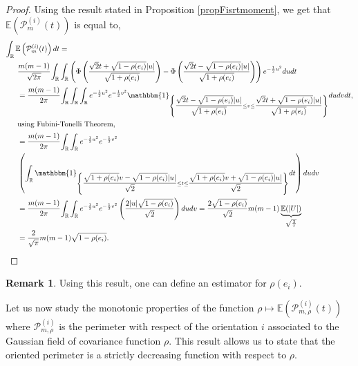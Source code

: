 \documentclass[12pt]{article}
\theoremstyle{Theorem}
\theoremstyle{definition}
\newtheorem{remark}{Remark}
\begin{document}
\begin{proof}
Using the result stated in Proposition \ref{propFisrtmoment}, we get that $\mathbb{E}\left(\mathcal{P}^{\scriptscriptstyle  (i)}_{m}(t) \right)$ is equal to,
{\small
\begin{align*}
\int_{\mathbb{R}} \mathbb{E}\left(\mathcal{P}^{(i)}_{m}(t)\right) dt & = \\
& \hspace{-2cm}\cfrac{m(m-1)}{\sqrt{2\pi}} \int_{\mathbb{R}}\int_{\mathbb{R}} \left(\Phi\left(\dfrac{\sqrt{2}t + \sqrt{1-\rho(e_i)}|u|}{\sqrt{1+\rho(e_i)}}\right) - \Phi\left(\dfrac{\sqrt{2}t - \sqrt{1-\rho(e_i)}|u|}{\sqrt{1+\rho(e_i)}}\right)\right)e^{-\frac{1}{2}u^2}dudt \\
& \hspace{-2cm}=\cfrac{m(m-1)}{2\pi} \int_{\mathbb{R}}\int_{\mathbb{R}}\int_{\mathbb{R}} e^{-\frac{1}{2}u^2}e^{-\frac{1}{2}v^2} \mathbbm{1}_{\left\{\dfrac{\sqrt{2}t - \sqrt{1-\rho(e_i)}|u|}{\sqrt{1+\rho(e_i)}}\leq v \leq\dfrac{\sqrt{2}t + \sqrt{1-\rho(e_i)}|u|}{\sqrt{1+\rho(e_i)}}\right\}} du dv dt ,\\
& \hspace{-2cm}\text{using Fubini-Tonelli Theorem,} \\
& \hspace{-2cm}= \cfrac{m(m-1)}{2\pi}\int_{\mathbb{R}}\int_{\mathbb{R}} e^{-\frac{1}{2}u^2}e^{-\frac{1}{2}v^2} \\
& \hspace{-2cm} \left(\int_{\mathbb{R}} \mathbbm{1}_{\left\{\dfrac{\sqrt{1+\rho(e_i)}v - \sqrt{1-\rho(e_i)}|u|}{\sqrt{2}}\leq t\leq\dfrac{\sqrt{1+\rho(e_i)}v + \sqrt{1-\rho(e_i)}|u|}{\sqrt{2}}\right\}} dt\right) du dv \\
& \hspace{-2cm}= \cfrac{m(m-1)}{2\pi} \int_{\mathbb{R}}\int_{\mathbb{R}} e^{-\frac{1}{2}u^2}e^{-\frac{1}{2}v^2}\left(\dfrac{2|u|\sqrt{1-\rho(e_i)}}{\sqrt{2}}\right)dudv = \frac{2\sqrt{1-\rho(e_i)}}{\sqrt{2}} m(m-1)\underbrace{\mathbb{E}(|U|)}_{\sqrt{\frac{2}{\pi}}}\\
&\hspace{-2cm}=\frac{2}{\sqrt{\pi}}m(m-1)\sqrt{1-\rho(e_i)}.
\end{align*}
}
\end{proof}
\begin{remark}
Using this result, one can define an estimator for $\rho(e_i)$. 
\end{remark}
Let us now study the monotonic properties of the function $\rho \mapsto \mathbb{E}\left(\mathcal{P}^{\scriptscriptstyle (i)}_{m, \rho}(t)\right)$ where $\mathcal{P}^{\scriptscriptstyle (i)}_{m, \rho}$ is the perimeter with respect of the orientation $i$ associated to the Gaussian field of covariance function $\rho$. This result allows us to state that the oriented perimeter is a strictly decreasing function with respect to $\rho$. 
\end{document}
